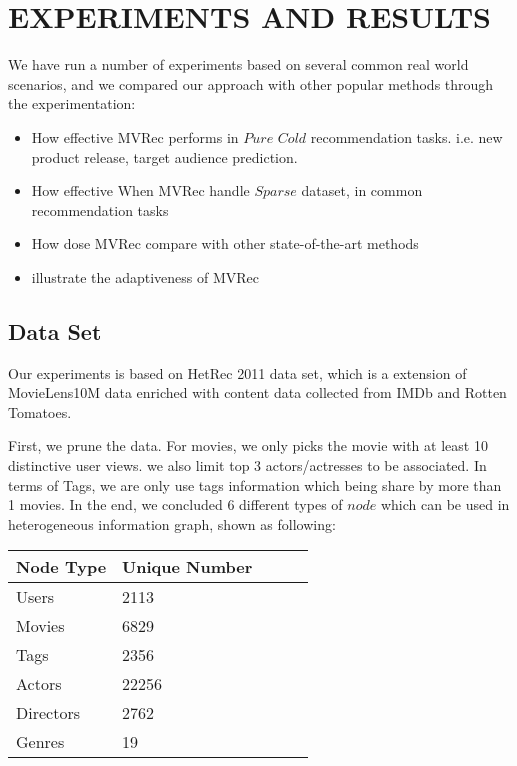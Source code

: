 \section{EXPERIMENTS AND RESULTS}\label{4_experiment}
We have run a number of experiments based on several common real world scenarios, and we compared our approach with other popular methods through the experimentation:
\begin{itemize}
    \item How effective MVRec performs in $Pure$ $Cold$ recommendation tasks. i.e. new product release, target audience prediction.
    \item How effective When MVRec handle $Sparse$ dataset, in common recommendation tasks
    \item How dose MVRec compare with other state-of-the-art methods
    \item illustrate the adaptiveness of MVRec 
\end{itemize}

\subsection{Data Set}
Our experiments is based on HetRec 2011 \cite{CantadorRecSys2011} data set, which is a extension of MovieLens10M data enriched with content data collected from IMDb and Rotten Tomatoes.

First, we prune the data. For movies, we only picks the movie with at least 10 distinctive user views. we also limit top 3 actors/actresses to be associated. In terms of Tags, we are only use tags information which being share by more than 1 movies. In the end, we concluded 6 different types of $node$ which can be used in heterogeneous information graph, shown as following:
\begin{center}
    \begin{tabular}{|l|l|l|l|l|}
    \hline
     \textbf{Node Type} & \textbf{Unique Number} \\ \hline
     Users &  2113\\ \hline
     Movies &   6829 \\ \hline
     Tags &  2356 \\ \hline
     Actors &  22256 \\ \hline
     Directors &  2762 \\ \hline
     Genres &  19 \\ \hline
    \end{tabular}
\end{center}

